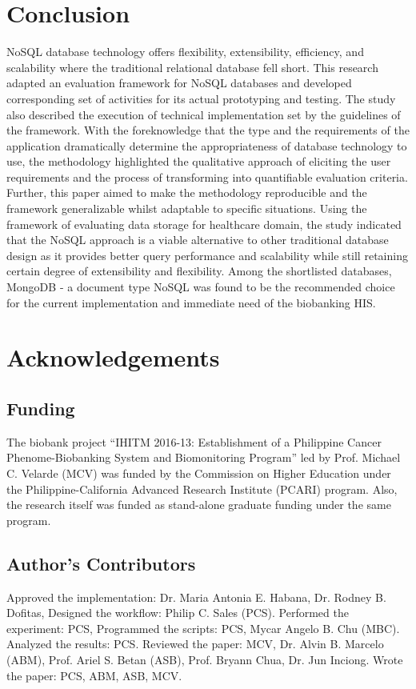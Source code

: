 \documentclass[5p]{elsarticle}
\begin{document}
\section{Conclusion}
NoSQL database technology offers flexibility, extensibility, efficiency, and scalability where the traditional relational database fell short. 
This research adapted an evaluation framework for NoSQL databases and developed corresponding set of activities for its actual prototyping and testing. 
The study also described the execution of technical implementation set by the guidelines of the framework. With the foreknowledge that the type and 
the requirements of the application dramatically determine the appropriateness of database technology to use, the methodology highlighted the 
qualitative approach of eliciting the user requirements and the process of transforming into quantifiable evaluation criteria. 
Further, this paper aimed to make the methodology reproducible and the framework generalizable whilst adaptable to specific situations. 
Using the framework of evaluating data storage for healthcare domain, the study indicated that the NoSQL approach is a viable alternative to 
other traditional database design as it provides better query performance and scalability while still retaining certain degree of extensibility and flexibility. 
Among the shortlisted databases, MongoDB - a document type NoSQL was found to be the recommended choice for the current implementation and immediate need of the biobanking HIS.

\section*{Acknowledgements}

\subsection*{Funding} The biobank project “IHITM 2016-13: Establishment of a Philippine Cancer 
Phenome-Biobanking System and Biomonitoring Program” led by Prof. Michael C. Velarde (MCV) was funded by the Commission on Higher Education under
the Philippine-California Advanced Research Institute (PCARI) program. Also, the research itself was funded as stand-alone graduate funding under the same program. 

\subsection*{Author's Contributors} 
Approved the implementation: Dr. Maria Antonia E. Habana, Dr. Rodney B. Dofitas, 
Designed the workflow: Philip C. Sales (PCS). Performed the experiment: PCS, 
Programmed the scripts: PCS, Mycar Angelo B. Chu (MBC). Analyzed the results: PCS. 
Reviewed the paper: MCV, Dr. Alvin B. Marcelo (ABM), Prof. Ariel S. Betan (ASB), Prof. Bryann Chua, Dr. Jun Inciong. 
Wrote the paper: PCS, ABM, ASB, MCV.
\end{document}
